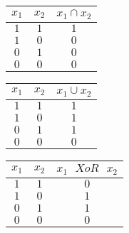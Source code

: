\documentclass[class=minimal,border=10pt]{standalone}
\begin{document}
    \begin{center}
    \begin{minipage}{0.3\linewidth} 
    \begin{tabular}{c|c|c}
        $x_1$ & $x_2$ & $x_1 \cap x_2$ \\
        \hline 
        $1$ & $1$ & $1$ \\
        \hline 
        $1$ & $0$ & $0$ \\
        \hline 
        $0$ & $1$ & $0$ \\
        \hline 
        $0$ & $0$ & $0$ \\
    \end{tabular}
    \end{minipage}
    \begin{minipage}{0.3\linewidth}
            \begin{tabular}{c|c|c}
            $x_1$ & $x_2$ & $x_1 \cup x_2$ \\
            \hline 
            $1$ & $1$ & $1$ \\
            \hline 
            $1$ & $0$ & $1$ \\
            \hline 
            $0$ & $1$ & $1$ \\
            \hline 
            $0$ & $0$ & $0$ \\
        \end{tabular}
    \end{minipage}
    \begin{minipage}{0.3\linewidth}
            \begin{tabular}{c|c|c}
            $x_1$ & $x_2$ & $x_1 \mbox{ } XoR \mbox{ } x_2$ \\
            \hline 
            $1$ & $1$ & $0$ \\
            \hline 
            $1$ & $0$ & $1$ \\
            \hline 
            $0$ & $1$ & $1$ \\
            \hline 
            $0$ & $0$ & $0$ \\
        \end{tabular}
    \end{minipage}
    \end{center}
\end{document}
